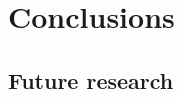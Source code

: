 \chapter{Conclusions}
\label{chap:conclusion}





\section{Future research}
\label{sec:futureResearch}




